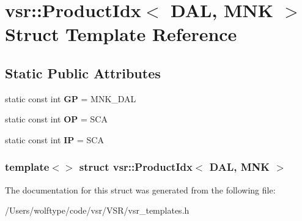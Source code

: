 \hypertarget{structvsr_1_1_product_idx_3_01_d_a_l_00_01_m_n_k_01_4}{\section{vsr\-:\-:Product\-Idx$<$ D\-A\-L, M\-N\-K $>$ Struct Template Reference}
\label{structvsr_1_1_product_idx_3_01_d_a_l_00_01_m_n_k_01_4}
}
\subsection*{Static Public Attributes}
\begin{DoxyCompactItemize}
\item 
\hypertarget{structvsr_1_1_product_idx_3_01_d_a_l_00_01_m_n_k_01_4_a6e9ec7051c37307ac7c6a084eccfeb77}{static const int {\bfseries G\-P} = M\-N\-K\-\_\-\-D\-A\-L}\label{structvsr_1_1_product_idx_3_01_d_a_l_00_01_m_n_k_01_4_a6e9ec7051c37307ac7c6a084eccfeb77}

\item 
\hypertarget{structvsr_1_1_product_idx_3_01_d_a_l_00_01_m_n_k_01_4_a72628a3709425df3fa84a938b05c0781}{static const int {\bfseries O\-P} = S\-C\-A}\label{structvsr_1_1_product_idx_3_01_d_a_l_00_01_m_n_k_01_4_a72628a3709425df3fa84a938b05c0781}

\item 
\hypertarget{structvsr_1_1_product_idx_3_01_d_a_l_00_01_m_n_k_01_4_ad19cd73caea7701a6eeb10c63e2716e4}{static const int {\bfseries I\-P} = S\-C\-A}\label{structvsr_1_1_product_idx_3_01_d_a_l_00_01_m_n_k_01_4_ad19cd73caea7701a6eeb10c63e2716e4}

\end{DoxyCompactItemize}
\subsubsection*{template$<$$>$ struct vsr\-::\-Product\-Idx$<$ D\-A\-L, M\-N\-K $>$}



The documentation for this struct was generated from the following file\-:\begin{DoxyCompactItemize}
\item 
/\-Users/wolftype/code/vsr/\-V\-S\-R/vsr\-\_\-templates.\-h\end{DoxyCompactItemize}
